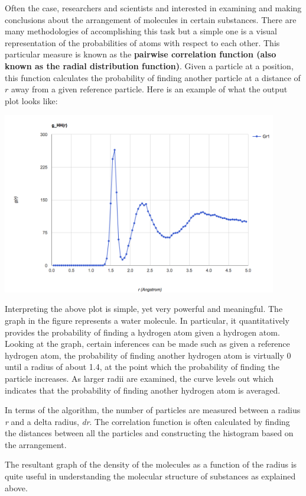 Often the case, researchers and scientists and interested in examining and making conclusions about the arrangement of molecules in certain substances. There are many methodologies of accomplishing this task but a simple one is a visual representation of the probabilities of atoms with respect to each other.
This particular measure is known as the \textbf{pairwise correlation function (also known as the radial distribution function)}. Given a particle at a position, this function calculates the probability of finding another particle at a distance of $r$ away from a given reference particle. Here is an example of what the output plot looks like:

\includegraphics[width=0.90\textwidth]{sample_plot}

Interpreting the above plot is simple, yet very powerful and meaningful. The graph in the figure represents a water molecule. In particular, it quantitatively provides the probability of finding a hydrogen atom given a hydrogen atom. Looking at the graph, certain inferences can be made such as given a reference hydrogen atom, the probability of finding another hydrogen atom is virtually 0 until a radius of about 1.4, at the point which the probability of finding the particle increases. As larger radii are examined, the curve levels out which indicates that the probability of finding another hydrogen atom is averaged. 


In terms of the algorithm, the number of particles are measured between a radius \textit{r} and a delta radius, \textit{dr}. The correlation function is often calculated by finding the distances between all the particles and constructing the histogram based on the arrangement.

The resultant graph of the density of the molecules as a function of the radius is quite useful in understanding the molecular structure of substances as explained above. 

